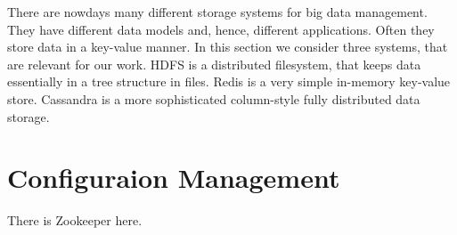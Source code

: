 There are nowdays many different storage systems for big data management.
They have different data models and, hence, different applications.
Often they store data in a key-value manner.
In this section we consider three systems, that are relevant for our work.
HDFS is a distributed filesystem, that keeps data essentially in a tree structure in files.
Redis is a very simple in-memory key-value store.
Cassandra is a more sophisticated column-style fully distributed data storage.





\section{Configuraion Management}

There is Zookeeper here.

